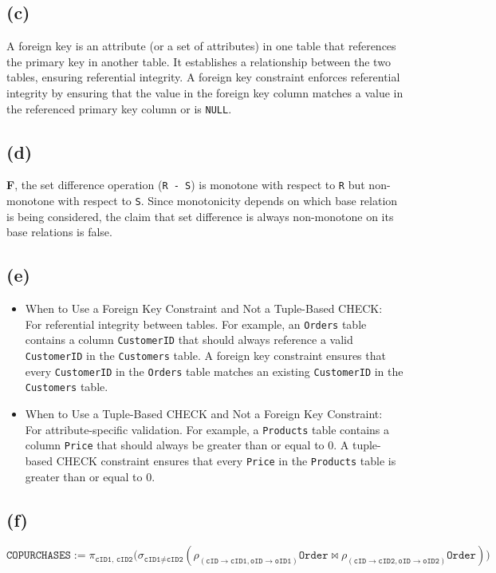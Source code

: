 \documentclass{article}
\begin{document}
\newpage
\subsection*{(c)}
A foreign key is an attribute (or a set of attributes) in one table that references the primary key in another table. It establishes a relationship between the two tables, ensuring referential integrity. A foreign key constraint enforces referential integrity by ensuring that the value in the foreign key column matches a value in the referenced primary key column or is \texttt{NULL}.

\subsection*{(d)}
\textbf{F}, the set difference operation (\texttt{R - S}) is monotone with respect to \texttt{R} but non-monotone with respect to \texttt{S}. Since monotonicity depends on which base relation is being considered, the claim that set difference is always non-monotone on its base relations is false.

\subsection*{(e)}
\begin{itemize}
    \item When to Use a Foreign Key Constraint and Not a Tuple-Based CHECK:\\
          For referential integrity between tables. For example, an \texttt{Orders} table contains a column \texttt{CustomerID} that should always reference a valid \texttt{CustomerID} in the \texttt{Customers} table. A foreign key constraint ensures that every \texttt{CustomerID} in the \texttt{Orders} table matches an existing \texttt{CustomerID} in the \texttt{Customers} table.
    \item When to Use a Tuple-Based CHECK and Not a Foreign Key Constraint:\\
          For attribute-specific validation. For example, a \texttt{Products} table contains a column \texttt{Price} that should always be greater than or equal to 0. A tuple-based CHECK constraint ensures that every \texttt{Price} in the \texttt{Products} table is greater than or equal to 0.
\end{itemize}

\subsection*{(f)}
$$
    \texttt{COPURCHASES} := \pi_{\texttt{cID1, cID2}} \bigg( \sigma_{\texttt{cID1} \neq \texttt{cID2}} \left( \rho_{(\texttt{cID}\rightarrow\texttt{cID1}, \texttt{oID}\rightarrow\texttt{oID1})} \texttt{Order} \bowtie \rho_{(\texttt{cID}\rightarrow\texttt{cID2}, \texttt{oID}\rightarrow\texttt{oID2})} \texttt{Order} \right) \bigg)
$$
\end{document}
